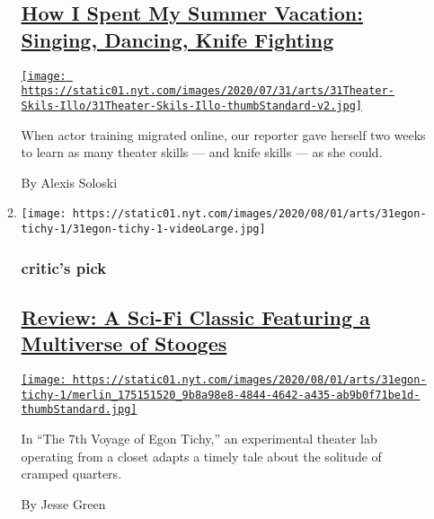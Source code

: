 \begin{enumerate}
\begin{enumerate}
    \hypertarget{how-i-spent-my-summer-vacation-singing-dancing-knife-fighting}{%
    \subsection{\texorpdfstring{\href{/2020/07/30/theater/theater-classes-at-home.html}{How
    I Spent My Summer Vacation: Singing, Dancing, Knife
    Fighting}}{How I Spent My Summer Vacation: Singing, Dancing, Knife Fighting}}\label{how-i-spent-my-summer-vacation-singing-dancing-knife-fighting}}

    \href{/2020/07/30/theater/theater-classes-at-home.html}{\texttt{[image: https://static01.nyt.com/images/2020/07/31/arts/31Theater-Skils-Illo/31Theater-Skils-Illo-thumbStandard-v2.jpg]}}

    When actor training migrated online, our reporter gave herself two
    weeks to learn as many theater skills --- and knife skills --- as
    she could.

    By Alexis Soloski
  \item
    \texttt{[image: https://static01.nyt.com/images/2020/08/01/arts/31egon-tichy-1/31egon-tichy-1-videoLarge.jpg]}

    \hypertarget{critics-pick}{%
    \subsubsection{critic's pick}\label{critics-pick}}

    \hypertarget{review-a-sci-fi-classic-featuring-a-multiverse-of-stooges}{%
    \subsection{\texorpdfstring{\href{/2020/07/31/theater/the-7th-voyage-of-egon-tichy-review.html}{Review:
    A Sci-Fi Classic Featuring a Multiverse of
    Stooges}}{Review: A Sci-Fi Classic Featuring a Multiverse of Stooges}}\label{review-a-sci-fi-classic-featuring-a-multiverse-of-stooges}}

    \href{/2020/07/31/theater/the-7th-voyage-of-egon-tichy-review.html}{\texttt{[image: https://static01.nyt.com/images/2020/08/01/arts/31egon-tichy-1/merlin\_175151520\_9b8a98e8-4844-4642-a435-ab9b0f71be1d-thumbStandard.jpg]}}

    In ``The 7th Voyage of Egon Tichy,'' an experimental theater lab
    operating from a closet adapts a timely tale about the solitude of
    cramped quarters.

    By Jesse Green
  \end{enumerate}
\end{enumerate}

